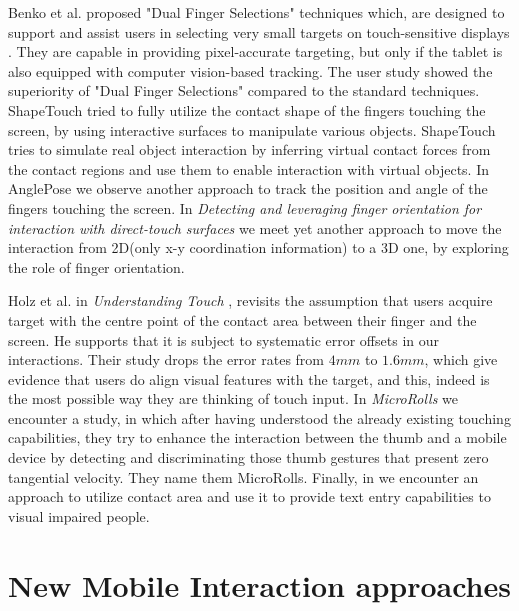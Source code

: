 Benko et al. proposed "Dual Finger Selections" techniques which, are designed to support and assist users in selecting very small targets on touch-sensitive displays \cite{Benko:2006:PST:1124772.1124963}. They are capable in providing pixel-accurate targeting, but only if the tablet is also equipped with computer vision-based tracking. The user study showed the superiority of "Dual Finger Selections" compared to the standard techniques. 
ShapeTouch \cite{CaoShapeTouch} tried to fully utilize the contact shape of the fingers touching the screen, by using interactive surfaces to manipulate various objects. ShapeTouch tries to simulate real object interaction by inferring virtual contact forces from the contact regions and use them to enable interaction with virtual objects. In AnglePose \cite{Rogers:2011:ARP:1978942.1979318} we observe another approach to track the position and angle of the fingers touching the screen.
In \emph{Detecting and leveraging finger orientation for interaction with direct-touch surfaces} \cite{Wang:2009:DLF:1622176.1622182} we meet yet another approach to move the interaction from 2D(only x-y coordination information) to a 3D one, by exploring the role of finger orientation.

Holz et al. in \emph{Understanding Touch} \cite{Holz:2011:UT:1978942.1979308}, revisits the assumption that users acquire target with the centre point of the contact area between their finger and the screen. He supports that it is subject to systematic error offsets in our interactions. Their study drops the error rates from $4mm$ to $1.6mm$, which give evidence that users do align visual features with the target, and this, indeed is the most possible way they are thinking of touch input.
 In \emph{MicroRolls} \cite{Roudaut:2009:MET:1518701.1518843} we encounter a study, in which after having understood the already existing touching capabilities, they try to enhance the interaction between the thumb and a mobile device by detecting and discriminating those thumb gestures that present zero tangential velocity. They name them MicroRolls. 
 Finally, in \cite{Goh:2014:ETE:2658779.2658780} we encounter an approach to utilize contact area and use it to provide text entry capabilities to visual impaired people.





\section{New Mobile Interaction approaches}

